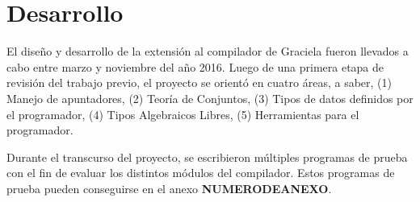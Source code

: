\chapter{Desarrollo}
\label{capitulo3}

El diseño y desarrollo de la extensión al compilador de Graciela fueron llevados
a cabo entre marzo y noviembre del año 2016. Luego de una primera etapa de
revisión del trabajo previo, el proyecto se orientó en cuatro áreas, a saber,
(1) Manejo de apuntadores, (2) Teoría de Conjuntos, (3) Tipos de datos definidos
por el programador, (4) Tipos Algebraicos Libres, (5) Herramientas para el
programador.

Durante el transcurso del proyecto, se escribieron múltiples programas de prueba
con el fin de evaluar los distintos módulos del compilador. Estos programas de
prueba pueden conseguirse en el anexo \textbf{NUMERODEANEXO}.

%
%

